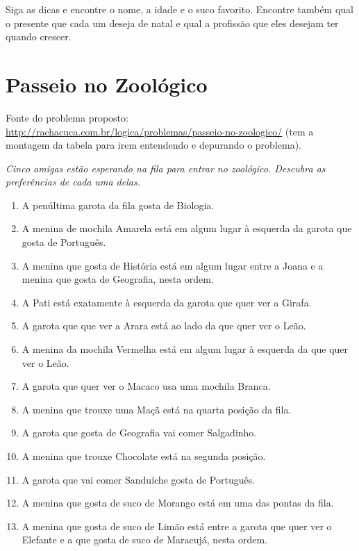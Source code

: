\documentclass[a4paper,12pt]{article}
\begin{document}
{\begin{enumerate}
\end{enumerate}

Siga as dicas e encontre o nome, a idade e o suco favorito. Encontre também qual o presente que cada um deseja de natal e qual a profissão que eles desejam ter quando crescer.


\newpage
\section{Passeio no Zoológico}

 Fonte do problema proposto:\\
 \url{http://rachacuca.com.br/logica/problemas/passeio-no-zoologico/}
 (tem a montagem da tabela para irem entendendo e depurando o problema).\\

{\em 
Cinco amigas estão esperando na fila para entrar no zoológico. Descubra as preferências de cada uma delas.
\begin{enumerate}
\item   A penúltima garota da fila gosta de Biologia.
\item	A menina de mochila Amarela está em algum lugar à esquerda da garota que gosta de Português.
\item	A menina que gosta de História está em algum lugar entre a Joana e a menina que gosta de Geografia, nesta ordem.
\item	A Pati está exatamente à esquerda da garota que quer ver a Girafa.
\item	A garota que que ver a Arara está ao lado da que quer ver o Leão.
\item	A menina da mochila Vermelha está em algum lugar à esquerda da que quer ver o Leão.
\item	A garota que quer ver o Macaco usa uma mochila Branca.
\item	A menina que trouxe uma Maçã está na quarta posição da fila.
\item	A garota que gosta de Geografia vai comer Salgadinho.
\item	A menina que trouxe Chocolate está na segunda posição.
\item	A garota que vai comer Sanduíche gosta de Português.
\item	A menina que gosta de suco de Morango está em uma das pontas da fila.
\item	A menina que gosta de suco de Limão está entre a garota que quer ver o Elefante e a que gosta de suco de Maracujá, nesta ordem.

\end{enumerate}}}
\end{document}
